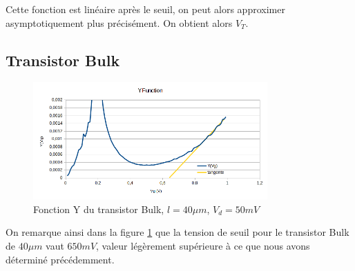 \documentclass[a4paper,11pt]{report}
\begin{document}
Cette fonction est linéaire après le seuil, on peut alors approximer asymptotiquement plus précisément. On obtient alors $V_T$.
\subsection{Transistor Bulk}
\begin{figure}[h]
    \begin{center}
        \includegraphics[width=0.8\textwidth]{Images/Bulk40-YFunction}
        \caption{Fonction Y du transistor Bulk, $l=40\mu m$, $V_d = 50mV$}
        \label{yfun_bulk_40}
    \end{center}
\end{figure}

On remarque ainsi dans la figure \ref{yfun_bulk_40} que la tension de seuil pour le transistor Bulk de $40\mu m$ vaut $650mV$, valeur légèrement supérieure à ce que nous avons déterminé précédemment.
\end{document}
